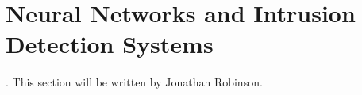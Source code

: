 \section{Neural Networks and Intrusion Detection Systems}
. This section will be written by Jonathan Robinson.
